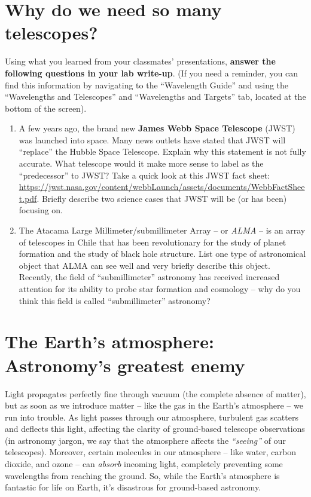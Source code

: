 \documentclass[11pt]{article}
\begin{document}
\section{Why do we need so many telescopes?}
Using what you learned from your classmates' presentations, \textbf{answer the following questions in your lab write-up}.  (If you need a reminder, you can find this information by navigating to the ``Wavelength Guide'' and using the ``Wavelengths and Telescopes'' and ``Wavelengths and Targets'' tab, located at the bottom of the screen).
\begin{enumerate}
    \item A few years ago, the brand new \textbf{James Webb Space Telescope} (JWST) was launched into space. Many news outlets have stated that JWST will ``replace'' the Hubble Space Telescope. Explain why this statement is not fully accurate. What telescope would it make more sense to label as the ``predecessor'' to JWST? Take a quick look at this JWST fact sheet: \url{https://jwst.nasa.gov/content/webbLaunch/assets/documents/WebbFactSheet.pdf}. Briefly describe two science cases that JWST will be (or has been) focusing on.
    
    \item The Atacama Large Millimeter/submillimeter Array -- or \emph{ALMA} -- is an array of telescopes in Chile that has been revolutionary for the study of planet formation and the study of black hole structure. List one type of astronomical object that ALMA can see well and very briefly describe this object. Recently, the field of ``submillimeter'' astronomy has received increased attention for its ability to probe star formation and cosmology -- why do you think this field is called ``submillimeter'' astronomy? 
    
\end{enumerate}

\section{The Earth's atmosphere: Astronomy's greatest enemy}

Light propagates perfectly fine through vacuum (the complete absence of matter), but as soon as we introduce matter -- like the gas in the Earth's atmosphere -- we run into trouble. As light passes through our atmosphere, turbulent gas scatters and deflects this light, affecting the clarity of ground-based telescope observations (in astronomy jargon, we say that the atmosphere affects the \emph{``seeing''} of our telescopes). Moreover, certain molecules in our atmosphere -- like water, carbon dioxide, and ozone -- can \emph{absorb} incoming light, completely preventing some wavelengths from reaching the ground. So, while the Earth's atmosphere is fantastic for life on Earth, it's disastrous for ground-based astronomy.
\end{document}
